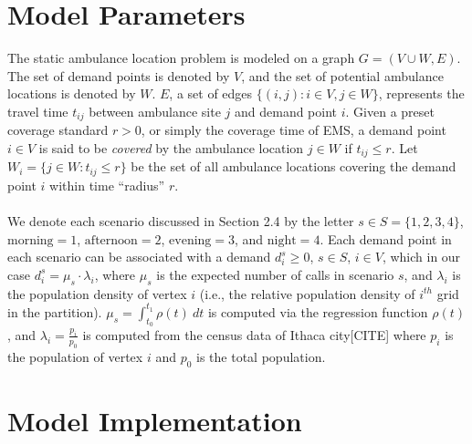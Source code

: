 \documentclass{article}
\begin{document}
\section{Model Parameters}
The static ambulance location problem is modeled on a graph $G = (V \cup W, E)$. The set of demand points is denoted by $V$, and the set of potential ambulance locations is denoted by $W$. $E$, a set of edges $\{( i, j): i \in V, j \in W\}$, represents the travel time $t_{ij}$ \cite{DIBENE2017107}
between ambulance site $j$ and demand point $i$. Given a preset coverage standard $r > 0$, or simply the coverage time of EMS, a demand point $i \in V$ is said to be \textit{covered} by the ambulance location $j \in W$ if $t_{ij} \leq r$. Let $W_{i}=\{j \in W : t_{ij} \leq r\}$ be the set of all ambulance locations covering the demand point $i$ within time “radius” $r$.
\\ \\
We denote each scenario discussed in Section 2.4 by the letter $s \in S = \{1,2,3,4\}$,  $\text{morning} = 1$, $\text{afternoon} = 2$, $\text{evening} = 3$, and $\text{night} = 4$. Each demand point in each scenario can be associated with a demand $d_i^s \geq 0$, $s \in S$, $i \in V$, which in our case $d_i^s = \mu_s \cdot \lambda_i$, where $\mu_s$ is the expected number of calls in scenario $s$, and $\lambda_i$ is the population density of vertex $i$ (i.e., the relative population density of $i^{th}$ grid in the partition). $\mu_s = \int_{t_0} ^{t_1} \rho(t) \ dt$ is computed via the  regression function $\rho(t)$, and $\lambda_i = \frac{p_i}{p_0}$ is computed from the census data of Ithaca city[CITE] where $p_i$ is the population of vertex $i$ and $p_0$ is the total population.

\section{Model Implementation}
\end{document}
